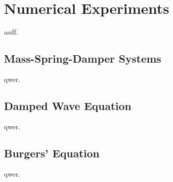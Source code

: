 \chapter{Numerical Experiments}\label{chap:numerical-experiments}

asdf.

\section{Mass-Spring-Damper Systems}\label{sec:msd-systems}

qwer.

\section{Damped Wave Equation}\label{sec:damped-wave-equation}

qwer.

\section{Burgers' Equation}\label{sec:burgers-equation}

qwer.
